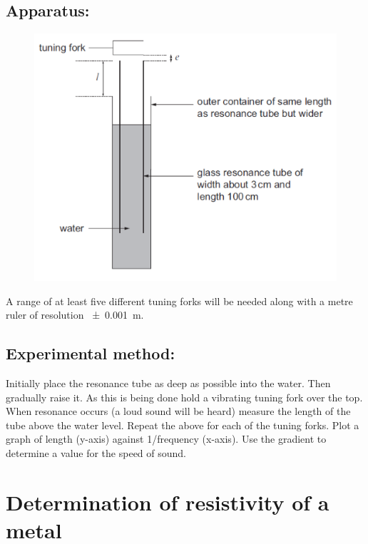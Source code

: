 \documentclass{tufte-handout}
\begin{document}
\subsection{Apparatus:}   
\begin{figure}
\includegraphics[width=\textwidth]{speedsound.PNG}
\end{figure}
   
A range of at least five different tuning forks will be needed along with a metre ruler of resolution \SI{\pm0.001}{m}. 
\subsection{Experimental method:}

Initially place the resonance tube as deep as possible into the water. Then gradually raise it. As this is being done hold a vibrating tuning fork over the top. When resonance occurs (a loud sound will be heard) measure the length of the tube above the water level.  Repeat the above for each of the tuning forks. Plot a graph of length (y-axis) against 1/frequency (x-axis). Use the gradient to determine a value for the speed of sound.
\section{Determination of resistivity of a metal}
\end{document}
